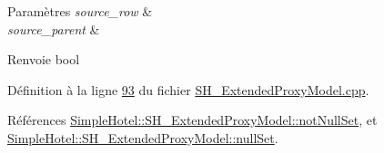 \begin{DoxyParams}{Paramètres}
{\em source\-\_\-row} & \\
\hline
{\em source\-\_\-parent} & \\
\hline
\end{DoxyParams}
\begin{DoxyReturn}{Renvoie}
bool 
\end{DoxyReturn}


Définition à la ligne \hyperlink{SH__ExtendedProxyModel_8cpp_source_l00093}{93} du fichier \hyperlink{SH__ExtendedProxyModel_8cpp_source}{S\-H\-\_\-\-Extended\-Proxy\-Model.\-cpp}.



Références \hyperlink{classSimpleHotel_1_1SH__ExtendedProxyModel_a7c7d8e43d6988da141f1c4ef032839a4}{Simple\-Hotel\-::\-S\-H\-\_\-\-Extended\-Proxy\-Model\-::not\-Null\-Set}, et \hyperlink{classSimpleHotel_1_1SH__ExtendedProxyModel_a3335d384f2c33af3db4db58af0a359e6}{Simple\-Hotel\-::\-S\-H\-\_\-\-Extended\-Proxy\-Model\-::null\-Set}.


